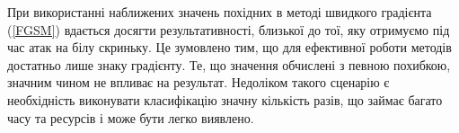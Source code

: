 \documentclass[14pt,a4paper]{extarticle}
\newcounter{e}
\numberwithin{equation}{section}
\numberwithin{figure}{section}
\begin{document}
 При використанні наближених значень похідних в методі швидкого градієнта (\ref{FGSM}) вдається досягти результативності, близької до тої, яку отримуємо під час атак на білу скриньку. Це зумовлено тим, що для ефективної роботи методів достатньо лише знаку градієнту. Те, що значення обчислені з певною похибкою, значним чином не впливає на результат. Недоліком такого сценарію є необхідність виконувати класифікацію значну кількість разів, що займає багато часу та ресурсів і може бути легко виявлено.

 
 
 
 
 
\end{document}
